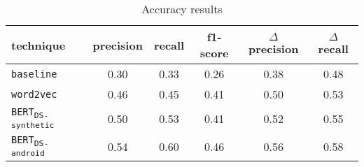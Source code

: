 \begin{table}[H]
\centering    
\begin{small}
\begin{threeparttable}
\begin{tabular}{lccccc}


\textbf{technique} & 
\textbf{precision} & \textbf{recall} & \textbf{f1-score} & 
$\Delta$ \textbf{precision} & $\Delta$ \textbf{recall} \\


\hline


\texttt{baseline} &
0.30 & 0.33 & 0.26 & 
0.38 & 0.48 
\\

\texttt{word2vec} &
0.46 & 0.45 & 0.41 & 
0.50 & 0.53 
\\

\texttt{BERT\textsubscript{DS-synthetic}} &
0.50 & 0.53 & 0.41 & 
0.52 & 0.55 
\\

\texttt{BERT\textsubscript{DS-android}} &
0.54 & 0.60 & 0.46 & 
0.56 & 0.58 
\\

\hline

\end{tabular}
\end{threeparttable}
\end{small}
\caption{Accuracy results}
\label{tbl:approach-results-overall}
\end{table}

